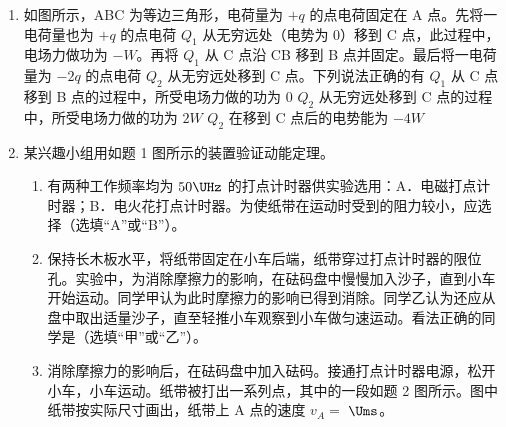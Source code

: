 \documentclass[\gkver]{gaokaozhenti}
\begin{document}
\begin{enumerate}
\item
如图所示，ABC 为等边三角形，电荷量为 $+q$ 的点电荷固定在 A 点。先将一电荷量也为 $+q$ 的点电荷 $Q_{1}$ 从无穷远处（电势为 0）移到 C 点，此过程中，电场力做功为 $-W$。再将 $Q_{1}$ 从 C 点沿 CB 移到 B 点并固定。最后将一电荷量为 $-2q$ 的点电荷 $Q_{2}$ 从无穷远处移到 C 点。下列说法正确的有
\onepicture[w=3.66cm]{}
{$Q_{1}$ 从 C 点移到 B 点的过程中，所受电场力做的功为 0}
{$Q_{2}$ 从无穷远处移到 C 点的过程中，所受电场力做的功为 $2W$}
{$Q_{2}$ 在移到 C 点后的电势能为 $-4W$}

\item
某兴趣小组用如题 1 图所示的装置验证动能定理。
\begin{enumerate}
	\item
	有两种工作频率均为 $50\UHz$ 的打点计时器供实验选用：A．电磁打点计时器；B．电火花打点计时器。为使纸带在运动时受到的阻力较小，应选择\tkanswer{}（选填“A”或“B”）。
	\item
	保持长木板水平，将纸带固定在小车后端，纸带穿过打点计时器的限位孔。实验中，为消除摩擦力的影响，在砝码盘中慢慢加入沙子，直到小车开始运动。同学甲认为此时摩擦力的影响已得到消除。同学乙认为还应从盘中取出适量沙子，直至轻推小车观察到小车做匀速运动。看法正确的同学是\tkanswer{}（选填“甲”或“乙”）。
	\item
	消除摩擦力的影响后，在砝码盘中加入砝码。接通打点计时器电源，松开小车，小车运动。纸带被打出一系列点，其中的一段如题 2 图所示。图中纸带按实际尺寸画出，纸带上 A 点的速度 $v_{A} =$ \tkanswer{} $\Ums$。
	

\end{enumerate}
\end{enumerate}
\end{document}

